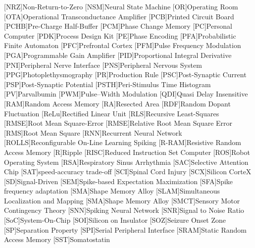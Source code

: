 [NRZ]{Non-Return-to-Zero}
[NSM]{Neural State Machine}
[OR]{Operating Room}
[OTA]{Operational Transconductance Amplifier}
[PCB]{Printed Circuit Board}
[PCHB]{Pre-Charge Half-Buffer}
[PCM]{Phase Change Memory}
[PC]{Personal Computer}
[PDK]{Process Design Kit}
[PE]{Phase Encoding}
[PFA]{Probabilistic Finite Automaton}
[PFC]{Prefrontal Cortex}
[PFM]{Pulse Frequency Modulation}
[PGA]{Programmable Gain Amplifier}
[PID]{Proportional Integral Derivative}
[PNI]{Peripheral Nerve Interface}
[PNS]{Peripheral Nervous System}
[PPG]{Photoplethysmography}
[PR]{Production Rule}
[PSC]{Post-Synaptic Current}
[PSP]{Post-Synaptic Potential}
[PSTH]{Peri-Stimulus Time Histogram}
[PV]{Parvalbumin}
[PWM]{Pulse--Width Modulation}
[QDI]{Quasi Delay Insensitive}
[RAM]{Random Access Memory}
[RA]{Resected Area}
[RDF]{Random Dopant Fluctuation}
[ReLu]{Rectified Linear Unit}
[RLS]{Recursive Least-Squares}
[RMSE]{Root Mean Square-Error}
[RMSE]{Relative Root Mean Square Error}
[RMS]{Root Mean Square}
[RNN]{Recurrent Neural Network}
[ROLLS]{Reconfigurable On-Line Learning Spiking}
[R-RAM]{Resistive Random Access Memory}
[R]{Ripple}
[RISC]{Reduced Instruction Set Computer}
[ROS]{Robot Operating System}
[RSA]{Respiratory Sinus Arrhythmia}
[SAC]{Selective Attention Chip}
[SAT]{speed-accuracy trade-off}
[SCI]{Spinal Cord Injury}
[SCX]{Silicon CorteX}
[SD]{Signal-Driven}
[SEM]{Spike-based Expectation Maximization}
[SFA]{Spike frequency adaptation}
[SMA]{Shape Memory Alloy} 
[SLAM]{Simultaneous Localization and Mapping}
[SMA]{Shape Memory Alloy}
[SMCT]{Sensory Motor Contingency Theory} 
[SNN]{Spiking Neural Network}
[SNR]{Signal to Noise Ratio}
[SoC]{System-On-Chip}
[SOI]{Silicon on Insulator}
[SOZ]{Seizure Onset Zone}
[SP]{Separation Property}
[SPI]{Serial Peripheral Interface}
[SRAM]{Static Random Access Memory}
[SST]{Somatostatin}
